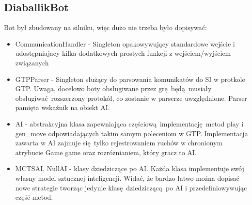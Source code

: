 \documentclass[a4paper,12pt]{article}
\begin{document}
\subsection*{DiaballikBot}
Bot był zbudowany na silniku, więc dużo nie trzeba było dopisywać:
\begin{itemize}
 \item CommunicationHandler - Singleton opakowywujący standardowe wejście i udostępniajacy kilka dodatkowych prostych funkcji z wejściem/wyjściem
 związanych
 \item GTPParser - Singleton służący do parsowania komunikatów do SI w protkole GTP. Uwaga, docelowo boty obsługiwane przez grę będą musiały
 obsługiwać rozszerzony protokół, co zostanie w parserze uwzględnione. Parser pamięta wskaźnik na obiekt AI.
 \item AI - abstrakcyjna klasa zapewniająca częściową implementację metod play i gen_move odpowiadających takim samym poleceniom w GTP. Implementacja
 zawarta w AI zajmuje się tylko rejestrowaniem ruchów w chronionym atrybucie Game game oraz rozróżnianiem, który gracz to AI.
 \item MCTSAI, NullAI - klasy dziedziczące po AI. Każda klasa implementuje swój własny model sztucznej inteligencji. Widać, że bardzo łatwo można
 dopisać nowe strategie tworząc jedynie klasę dziedziczącą po AI i przedefiniowywując część metod.
\end{itemize}

\subsection*{}
\end{document}
